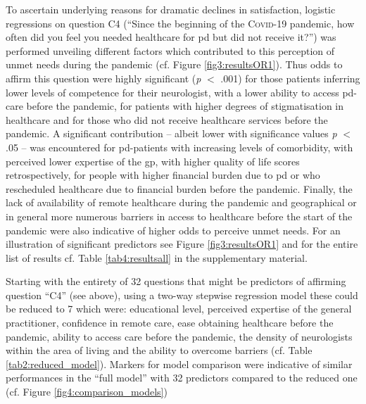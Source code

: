 \documentclass{bmcart}
\begin{document}
To ascertain underlying reasons for dramatic declines in satisfaction, logistic regressions on question C4 (``Since the beginning of the \textsc{Covid}-19 pandemic, how often did you feel you needed healthcare for \acl{pd} but did not receive it?'') was performed unveiling different factors which contributed to this perception of unmet needs during the pandemic (cf. Figure \ref{fig3:resultsOR1}). Thus odds to affirm this question were highly significant (\textit{p} $<$ .001) for those patients inferring lower levels of competence for their neurologist, with a lower ability to access \ac{pd}-care before the pandemic, for patients with higher degrees of stigmatisation in healthcare and for those who did not receive healthcare services before the pandemic. A significant contribution -- albeit lower with significance values \textit{p} $<$ .05 --  was encountered for \ac{pd}-patients with increasing levels of comorbidity, with perceived lower expertise of the \ac{gp}, with higher quality of life scores retrospectively, for people with higher financial burden due to \ac{pd} or who rescheduled healthcare due to financial burden before the pandemic. Finally, the lack of availability of remote healthcare during the pandemic and geographical or in general more numerous barriers in access to healthcare before the start of the pandemic were also indicative of higher odds to perceive unmet needs. For an illustration of significant predictors see Figure \ref{fig3:resultsOR1} and for the entire list of results cf. Table  \ref{tab4:resultsall} in the supplementary material. 

Starting with the entirety of 32 questions that might be predictors of affirming question ``C4'' (see above), using a two-way stepwise regression model these could be reduced to 7 which were: educational level, perceived expertise of the general practitioner, confidence in remote care, ease obtaining healthcare before the pandemic, ability to access care before the pandemic, the density of neurologists within the area of living and the ability to overcome barriers (cf. Table \ref{tab2:reduced_model}). Markers for model comparison were indicative of similar performances in the ``full model'' with 32 predictors compared to the reduced one (cf. Figure \ref{fig4:comparison_models})

\newpage
\end{document}
